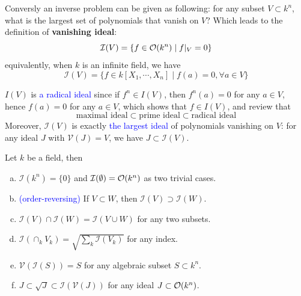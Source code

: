 Conversly an inverse problem can be given as following: for any subset \(V \subset k^n\), what is the largest set of polynomials that vanish on \(V\)? Which leads to the definition of \textbf{vanishing ideal}:
\[\mathcal{I}(V) = \{f \in \mathcal{O}(k^n) \mid f|_V = 0 \}\]
equivalently, when \(k\) is an infinite field, we have
\[\mathcal{I}(V) = \{f \in k[X_1,\cdots,X_n] \mid f(a) = 0 ,  \forall a \in V\}\]

\begin{remark}
    \(I(V)\) is \textcolor{blue}{a radical ideal} since if \(f^n \in I(V)\), then \(f^n(a) = 0\) for any \(a \in V\), hence \(f(a) = 0\) for any \(a \in V\), which shows that \(f \in I(V)\), and review that 
    \[\text{maximal ideal} \subset \text{prime ideal} \subset \text{radical ideal}\]
    Moreover, \(\mathcal{I}(V)\) is exactly \textcolor{blue}{the largest ideal} of polynomials vanishing on \(V\): for any ideal \(J\) with \(\mathcal{V}(J) = V\), we have \(J \subset \mathcal{I}(V)\).
\end{remark}

\begin{proposition} \label{vanish-ideal}
    Let \(k\) be a field, then 
    \begin{enumerate}[(a)]
        \item \(\mathcal{I}(k^n) = \{0\}\) and \(\mathcal{I}(\emptyset) = \mathcal{O}(k^n)\) as two trivial cases.
        \item \textcolor{blue}{(order-reversing)} If \(V \subset W\), then \(\mathcal{I}(V) \supset \mathcal{I}(W)\).
        \item \(\mathcal{I}(V)\cap \mathcal{I}(W) = \mathcal{I}(V\cup W)\) for any two subsets.
        \item \(\mathcal{I}(\cap_k V_k) = \sqrt{\sum_k \mathcal{I}(V_k)}\) for any index.
        \item \(\mathcal{V}(\mathcal{I}(S)) = S\) for any algebraic subset \(S \subset k^n\).
        \item \(J \subset \sqrt{J} \subset \mathcal{I}( \mathcal{V}(J)) \) for any ideal \(J \subset \mathcal{O}(k^n)\).
    \end{enumerate}
\end{proposition}

